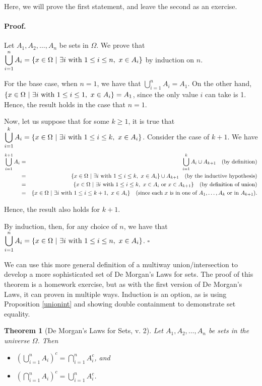 \documentclass{article}
\newtheorem{theorem}{Theorem}
\theoremstyle{definition}
\renewenvironment{proof} {\paragraph{Proof.}}{\hfill$\square$}
\begin{document}
Here, we will prove the first statement, and leave the second as an exercise.
\begin{proof}
Let $A_1, A_2, \dots, A_n$ be sets in $\Omega$. We prove that $\displaystyle\bigcup_{i=1}^n A_i = \{x\in\Omega\ |\ \exists i\hbox{ with $1\leq i\leq n$}, \ x\in A_i\}$ by induction on $n$.

For the base case, when $n=1$, we have that $\displaystyle\bigcup_{i=1}^n A_i = A_1.$ On the other hand, $\{x\in \Omega\ | \ \exists i\hbox{ with $1\leq i\leq 1$}, \ x\in A_i\} = A_1$, since the only value $i$ can take is 1. Hence, the result holds in the case that $n=1$. 

Now, let us suppose that for some $k\geq 1$, it is true that $\displaystyle\bigcup_{i=1}^k A_i = \{x\in\Omega\ |\ \exists i\hbox{ with $1\leq i\leq k$}, \ x\in A_i\}$. Consider the case of $k+1$. We have
\begin{eqnarray*}
\displaystyle\bigcup_{i=1}^{k+1} A_i & = & \displaystyle\bigcup_{i=1}^k A_i \cup A_{k+1}\quad \hbox{(by definition)}\\
& = & \{x\in\Omega\ |\ \exists i\hbox{ with $1\leq i\leq k$}, \ x\in A_i\}\cup A_{k+1}\quad \hbox{(by the inductive hypothesis)}\\
& = & \{x\in\Omega\ |\ \exists i\hbox{ with $1\leq i\leq k$}, \ x\in A_i \hbox{ or }x\in A_{k+1}\}\quad \hbox{(by definition of union)}\\
& = & \{x\in\Omega\ |\ \exists i\hbox{ with $1\leq i\leq k+1$}, \ x\in A_i\}\quad \hbox{(since each $x$ is in one of $A_1, \dots, A_k$ or in $A_{k+1}$)}.
\end{eqnarray*}

Hence, the result also holds for $k+1$.

By induction, then, for any choice of $n$, we have that $\displaystyle\bigcup_{i=1}^n A_i = \{x\in\Omega\ |\ \exists i\hbox{ with $1\leq i\leq n$}, \ x\in A_i\}$.
\end{proof}

We can use this more general definition of a multiway union/intersection to develop a more sophisticated set of De Morgan's Laws for sets. The proof of this theorem is a homework exercise, but as with the first version of De Morgan's Laws, it can proven in multiple ways. Induction is an option, as is using Proposition \ref{unionint} and showing double containment to demonstrate set equality.

\begin{theorem}[De Morgan's Laws for Sets, v. 2]
Let $A_1, A_2, \dots, A_n$ be sets in the universe $\Omega$. Then
\begin{itemize}
\item $\left(\displaystyle\bigcup_{i=1}^n A_i\right)^c = \displaystyle\bigcap_{i=1}^n A_i^c$, and
\item $\left(\displaystyle\bigcap_{i=1}^n A_i\right)^c = \displaystyle\bigcup_{i=1}^n A_i^c$.
\end{itemize}
\end{theorem}
\end{document}
